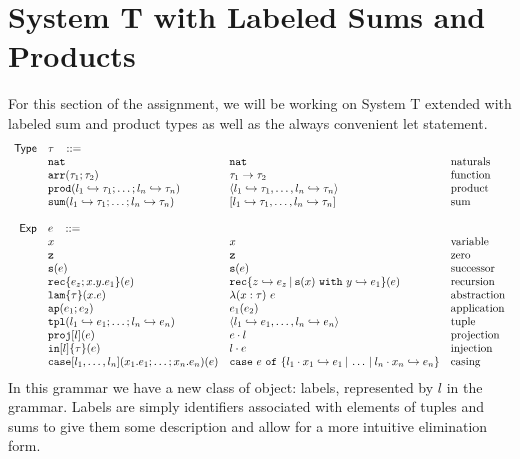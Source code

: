 \documentclass[11pt]{article}
\newcommand{\ms}[1]{\ensuremath{\mathsf{#1}}}
\newcommand{\irl}[1]{\mathtt{#1}}
\newcommand{\lam}{\irl{lam}}
\newcommand{\parr}[2]{#1 \to #2}
\newcommand{\pair}[2]{\langle #1, #2 \rangle}
\newcommand{\goesto}{\hookrightarrow}
\newcommand{\hra}{\hookrightarrow}
\newcommand{\zero}{\irl{z}}
\newcommand{\suc}[1]{\irl{s}(#1)}
\newcommand{\rec}[5]{\irl{rec}\{z \goesto #2 \por \suc{#3} ~\irl{with}~#4 \goesto #5\}(#1)}
\newcommand{\fn}[3]{\lambda(#1:#2)~#3}
\newcommand{\ap}[2]{#1(#2)}
\newcommand{\lprodt}[1]{\langle #1\rangle}
\newcommand{\lsumt}[1]{[#1]}
\newcommand{\lpair}{\pair{l_1\hra e_1}{\dots,l_n\hra e_n}}
\newcommand{\lprodtn}{\lprodt{l_1\hra\tau_1,\dots,l_n\hra\tau_n}}
\newcommand{\lsumtn}{\lsumt{l_1\hra\tau_1,\dots,l_n\hra\tau_n}}
\newcommand{\proj}[2]{#1\cdot#2}
\newcommand{\inj}[3]{{#2}\cdot{#3}}
\newcommand{\case}[2]{\irl{case}~#1~\irl{ of }~\{#2\}}
\newcommand{\casen}{\case{e}{\inj{}{l_1}{x_1} \hra e_1\por \dots \por \inj{}{l_n}{x_n} \hra e_n}}
\newcommand{\por}{\hspace*{.2em}|\hspace*{.2em}}
\begin{document}
\section{System T with Labeled Sums and Products}
For this section of the assignment, we will be working on System T extended with labeled sum and product types as well as the always convenient let statement.
\[
\begin{array}{r l l l l}
\ms{Type} & \tau \,\,\,\,\, ::= \\
	& \irl{nat}                	 			& \irl{nat}											& \text{naturals}\\
      	&\irl{arr}(\tau_1;\tau_2) 				& \parr{\tau_1}{\tau_2} 									& \text{function}\\
        &\irl{prod}(l_1\hra\tau_1;\dots;l_n\hra\tau_n)		& \lprodtn											& \text{product}\\
      	&\irl{sum}(l_1\hra\tau_1;\dots;l_n\hra\tau_n)		& \lsumtn											& \text{sum}\\
	 \\
\ms{Exp}
        & e   \,\,\,\,\, ::= \\
 	& x                                			& x 												& \text{variable}\\
        & \zero							& \zero												& \text{zero}\\
        & \suc{e}                     				& \suc{e}											& \text{successor} \\
        & \irl{rec}\{e_z;x.y.e_1\}(e)   			& \rec{e}{e_z}{x}{y}{e_1}									& \text{recursion}\\
        & \lam\{\tau\}(x.e)           				& \fn{x}{\tau}{e}										& \text{abstraction} \\
        & \irl{ap}(e_1;e_2) 					& \ap{e_1}{e_2} 										& \text{application}\\
        & \irl{tpl}(l_1\hra e_1;\dots;l_n\hra e_n)     	& \lpair                									& \text{tuple}\\
 	& \irl{proj}[l](e)					& \proj{e}{l}   										& \text{projection}\\
	& \irl{in}[l]\{\tau\}(e)				& \inj{\tau}{l}{e}      									& \text{injection}\\
	& \irl{case}[l_1,\dots,l_n](x_1.e_1;\dots;x_n.e_n)(e) 	& \casen											& \text{casing}\\
\end{array}
\]
In this grammar we have a new class of object: labels, represented by $l$ in the grammar. Labels are simply identifiers
associated with elements of tuples and sums to give them some description and allow for a more intuitive elimination
form.
\end{document}
